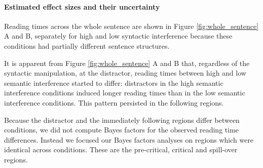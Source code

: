 \documentclass[a4paper, man, floatsintext]{apa7}
\begin{document}
\paragraph{Estimated effect sizes and their uncertainty}

Reading times across the whole sentence are shown in Figure \ref{fig:whole_sentence} A and B, separately for high and low syntactic interference because these conditions had partially different sentence structures. 


It is apparent from Figure \ref{fig:whole_sentence} A and B that, regardless of the syntactic manipulation, at the distractor, reading times between high and low semantic interference started to differ: distractors in the high semantic interference conditions induced longer reading times than in the low semantic interference conditions. This pattern persisted in the following regions.

Because the distractor and the immediately following regions differ between conditions, we did not compute Bayes factors for the observed reading time differences. Instead we focused our Bayes factors analyses on regions which were identical across conditions. These are the pre-critical, critical and spill-over regions.
\end{document}
